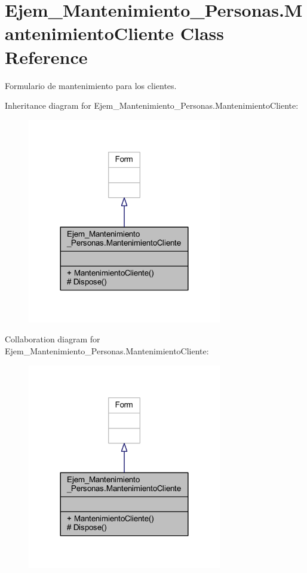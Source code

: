 \hypertarget{class_ejem___mantenimiento___personas_1_1_mantenimiento_cliente}{}\section{Ejem\+\_\+\+Mantenimiento\+\_\+\+Personas.\+Mantenimiento\+Cliente Class Reference}
\label{class_ejem___mantenimiento___personas_1_1_mantenimiento_cliente}


Formulario de mantenimiento para los clientes.  




Inheritance diagram for Ejem\+\_\+\+Mantenimiento\+\_\+\+Personas.\+Mantenimiento\+Cliente\+:
\nopagebreak
\begin{figure}[H]
\begin{center}
\leavevmode
\includegraphics[width=240pt]{class_ejem___mantenimiento___personas_1_1_mantenimiento_cliente__inherit__graph}
\end{center}
\end{figure}


Collaboration diagram for Ejem\+\_\+\+Mantenimiento\+\_\+\+Personas.\+Mantenimiento\+Cliente\+:
\nopagebreak
\begin{figure}[H]
\begin{center}
\leavevmode
\includegraphics[width=240pt]{class_ejem___mantenimiento___personas_1_1_mantenimiento_cliente__coll__graph}
\end{center}
\end{figure}
